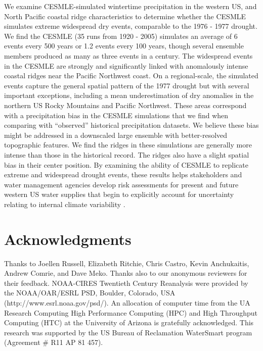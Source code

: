 \documentclass[final, double]{ua-thesis}
\begin{document}
We examine CESMLE-simulated wintertime precipitation in the western US, and North Pacific coastal ridge characteristics to determine whether the CESMLE simulates extreme widespread dry events, comparable to the 1976 - 1977 drought. We find the CESMLE (35 runs from 1920 - 2005) simulates an average of 6 events every 500 years or 1.2 events every 100 years, though several ensemble members produced as many as three events in a century. The widespread events in the CESMLE are strongly and significantly linked with anomalously intense coastal ridges near the Pacific Northwest coast. On a regional-scale, the simulated events capture the general spatial pattern of the 1977 drought but with several important exceptions, including a mean underestimation of dry anomalies in the northern US Rocky Mountains and Pacific Northwest. These areas correspond with a precipitation bias in the CESMLE simulations that we find when comparing with ``observed'' historical precipitation datasets. We believe these bias might be addressed in a downscaled large ensemble with better-resolved topographic features. We find the ridges in these simulations are generally more intense than those in the historical record. The ridges also have a slight spatial bias in their center position. By examining the ability of CESMLE to replicate extreme and widespread drought events, these results helps stakeholders and water management agencies develop risk assessments for present and future western US water supplies that begin to explicitly account for uncertainty relating to internal climate variability \citep{3reclamation_bureau_of_reclamation_west-wide_2016}.

\section{Acknowledgments}

Thanks to Joellen Russell, Elizabeth Ritchie, Chris Castro, Kevin Anchukaitis, Andrew Comrie, and Dave Meko. Thanks also to our anonymous reviewers for their feedback. NOAA-CIRES Twentieth Century Reanalysis were provided by the NOAA/OAR/ESRL PSD, Boulder, Colorado, USA (http://www.esrl.noaa.gov/psd/). An allocation of computer time from the UA Research Computing High Performance Computing (HPC) and High Throughput Computing (HTC) at the University of Arizona is gratefully acknowledged. This research was supported by the US Bureau of Reclamation WaterSmart program (Agreement \# R11 AP 81 457).

% 
% 
\end{document}
